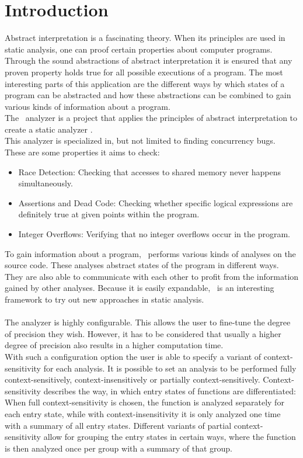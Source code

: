 
\chapter{Introduction}\label{chapter:introduction}
  Abstract interpretation is a fascinating theory. When its principles are used in static analysis, one can proof certain properties about computer programs. Through the sound abstractions of abstract interpretation it is ensured that any proven property holds true for all possible executions of a program. The most interesting parts of this application are the different ways by which states of a program can be abstracted and how these abstractions can be combined to gain various kinds of information about a program.\\
  The \gob\ analyzer is a project that applies the principles of abstract interpretation to create a static analyzer \parencite{goblintHome}.\\
  This analyzer is specialized in, but not limited to finding concurrency bugs. These are some properties it aims to check:
  \begin{itemize}
    \item Race Detection: Checking that accesses to shared memory never happens simultaneously.
    \item Assertions and Dead Code: Checking whether specific logical expressions are definitely true at given points within the program. 
    \item Integer Overflows: Verifying that no integer overflows occur in the program.
  \end{itemize}
  To gain information about a program, \gob\ performs various kinds of analyses on the source code. These analyses abstract states of the program in different ways. They are also able to communicate with each other to profit from the information gained by other analyses. Because it is easily expandable, \gob\ is an interesting framework to try out new approaches in static analysis.\\
  \\
  The analyzer is highly configurable. This allows the user to fine-tune the degree of precision they wish. However, it has to be considered that usually a higher degree of precision also results in a higher computation time.\\
  With such a configuration option the user is able to specify a variant of context-sensitivity for each analysis. It is possible to set an analysis to be performed fully context-sensitively, context-insensitively or partially context-sensitively. Context-sensitivity describes the way, in which entry states of functions are differentiated: When full context-sensitivity is chosen, the function is analyzed separately for each entry state, while with context-insensitivity it is only analyzed one time with a summary of all entry states. Different variants of partial context-sensitivity allow for grouping the entry states in certain ways, where the function is then analyzed once per group with a summary of that group.\\
